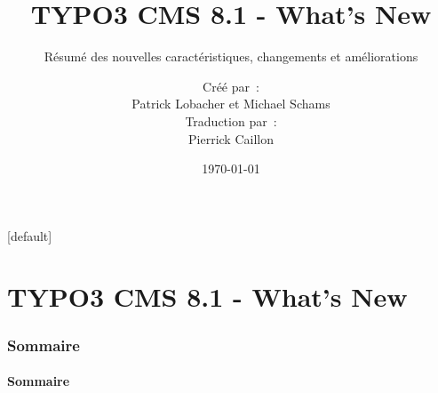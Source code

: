 \documentclass[t]{beamer}
\title{TYPO3 CMS 8.1 - What's New}
\subtitle{Résumé des nouvelles caractéristiques, changements et améliorations}
\author{
	\centerline{Créé par~:}
	\centerline{Patrick Lobacher et Michael Schams}
	\vspace{0.2cm}
	\centerline{Traduction par~:}
	Pierrick Caillon
}
\date{\today}
\begin{document}
\sharefont


\begingroup
	[default]
	\begin{frame}
		\titlepage
	\end{frame}
\endgroup


\section*{TYPO3 CMS 8.1 - What's New}
\begin{frame}[fragile]
	\frametitle{Sommaire}
	\framesubtitle{Sommaire}

	\tableofcontents

\end{frame}










\end{document}
